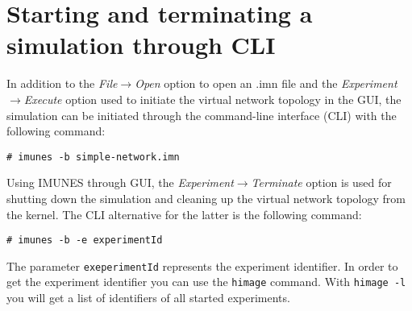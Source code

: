 \section{Starting and terminating a simulation through CLI}
In addition to the \emph{File$\to$Open} option to open an .imn file and the
\emph{Experiment$\to$Execute} option used to initiate the virtual network
topology in the GUI, the simulation can be initiated through the command-line
interface (CLI) with the following command:

\texttt{\# imunes -b simple-network.imn}
 
Using IMUNES through GUI, the \emph{Experiment$\to$Terminate} option is used
for shutting down the simulation and cleaning up the virtual network topology
from the kernel. The CLI alternative for the latter is the following command:

\texttt{\# imunes -b -e experimentId}

The parameter \texttt{exeperimentId} represents the experiment identifier. In
order to get the experiment identifier you can use the \texttt{himage} command.
With \texttt{himage -l} you will get a list of identifiers of all started
experiments. 

%  
% 
% 
% 

